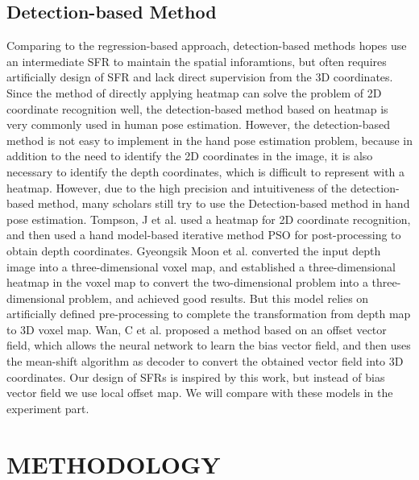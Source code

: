 \documentclass[journal]{IEEEtran}
\begin{document}
\subsection{Detection-based Method}
Comparing to the regression-based approach, detection-based methods\cite{ge2018robust, tompson2014real, chang2018v2v, wan2018dense} hopes use an intermediate SFR to maintain the spatial inforamtions, 
but often requires artificially design of SFR and lack direct supervision from the 3D coordinates. 
Since the method of directly applying heatmap can solve the problem of 2D coordinate recognition well, 
the detection-based method based on heatmap is very commonly used in human pose estimation. 
However, the detection-based method is not easy to implement in the hand pose estimation problem, 
because in addition to the need to identify the 2D coordinates in the image, it is also necessary to identify the depth coordinates, which is difficult to represent with a heatmap. 
However, due to the high precision and intuitiveness of the detection-based method, many scholars still try to use the Detection-based method in hand pose estimation. 
Tompson, J et al.\cite{tompson2014real} used a heatmap for 2D coordinate recognition, and then used a hand model-based iterative method PSO for post-processing to obtain depth coordinates. 
Gyeongsik Moon et al.\cite{chang2018v2v} converted the input depth image into a three-dimensional voxel map, and established a three-dimensional heatmap in the voxel map to convert the two-dimensional problem into a three-dimensional problem, and achieved good results. 
But this model relies on artificially defined pre-processing to complete the transformation from depth map to 3D voxel map. 
Wan, C et al.\cite{wan2018dense} proposed a method based on an offset vector field, which allows the neural network to learn the bias vector field, and then uses the mean-shift algorithm as decoder to convert the obtained vector field into 3D coordinates. 
Our design of SFRs is inspired by this work, but instead of bias vector field we use local offset map. We will compare with these models in the experiment part.





\section{METHODOLOGY}
\label{METHODOLOGY}
\end{document}
